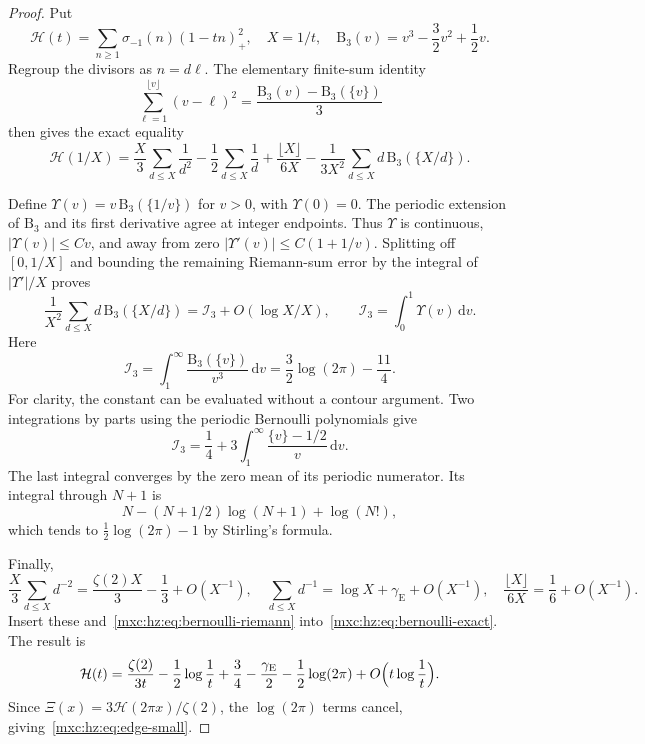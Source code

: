 \documentclass[11pt]{article}
\numberwithin{equation}{section}
\theoremstyle{definition}
\theoremstyle{remark}
\newcommand{\dd}{\,\mathrm d}
\newcommand{\gE}{\gamma_{\mathrm E}}
\begin{document}
\begin{proof}
Put
\[
 \mathcal H(t)=\sum_{n\ge1}\sigma_{-1}(n)(1-tn)_+^2,
 \quad X=1/t,\quad
 \mathrm B_3(v)=v^3-\frac32v^2+\frac12v.
\]
Regroup the divisors as $n=d\ell$. The elementary finite-sum identity
\[
 \sum_{\ell=1}^{\lfloor v\rfloor}(v-\ell)^2
 =\frac{\mathrm B_3(v)-\mathrm B_3(\{v\})}{3}
\]
then gives the exact equality
\begin{equation}\label{mxc:hz:eq:bernoulli-exact}
 \mathcal H(1/X)
 =\frac X3\sum_{d\le X}\frac1{d^2}
  -\frac12\sum_{d\le X}\frac1d+\frac{\lfloor X\rfloor}{6X}
  -\frac1{3X^2}\sum_{d\le X}d\,\mathrm B_3(\{X/d\}).
\end{equation}

Define $\Upsilon(v)=v\,\mathrm B_3(\{1/v\})$ for $v>0$, with
$\Upsilon(0)=0$. The periodic extension of $\mathrm B_3$ and its first
derivative agree at integer endpoints. Thus $\Upsilon$ is continuous,
$|\Upsilon(v)|\le Cv$, and away from zero $|\Upsilon'(v)|\le C(1+1/v)$.
Splitting off $[0,1/X]$ and bounding the remaining Riemann-sum error by the
integral of $|\Upsilon'|/X$ proves
\begin{equation}\label{mxc:hz:eq:bernoulli-riemann}
 \frac1{X^2}\sum_{d\le X}d\,\mathrm B_3(\{X/d\})
 =\mathcal I_3+O(\log X/X),\qquad \mathcal I_3=\int_0^1\Upsilon(v)\dd v.
\end{equation}
Here
\[
 \mathcal I_3=\int_1^\infty\frac{\mathrm B_3(\{v\})}{v^3}\dd v
   =\frac32\log(2\pi)-\frac{11}{4}.
\]
For clarity, the constant can be evaluated without a contour argument. Two
integrations by parts using the periodic Bernoulli polynomials give
\[
 \mathcal I_3=\frac14+3\int_1^\infty\frac{\{v\}-1/2}{v}\dd v.
\]
The last integral converges by the zero mean of its periodic numerator. Its
integral through $N+1$ is
\[
 N-(N+1/2)\log(N+1)+\log(N!),
\]
which tends to $\frac12\log(2\pi)-1$ by Stirling's formula.

Finally,
\[
 \frac X3\sum_{d\le X}d^{-2}=\frac{\zeta(2) X}{3}-\frac13+O(X^{-1}),\quad
 \sum_{d\le X}d^{-1}=\log X+\gE+O(X^{-1}),\quad
 \frac{\lfloor X\rfloor}{6X}=\frac16+O(X^{-1}).
\]
Insert these and~\eqref{mxc:hz:eq:bernoulli-riemann}
into~\eqref{mxc:hz:eq:bernoulli-exact}. The result is
\begin{equation}\label{mxc:hz:eq:H-small}
 \mathcal H(t)=\frac{\zeta(2)}{3t}-\frac12\log\frac1t
       +\frac34-\frac{\gE}2-\frac12\log(2\pi)
       +O\Bigl(t\log\frac1t\Bigr).
\end{equation}
Since $\Xi(x)=3\mathcal H(2\pi x)/\zeta(2)$, the $\log(2\pi)$ terms cancel,
giving~\eqref{mxc:hz:eq:edge-small}.
\end{proof}
\end{document}
